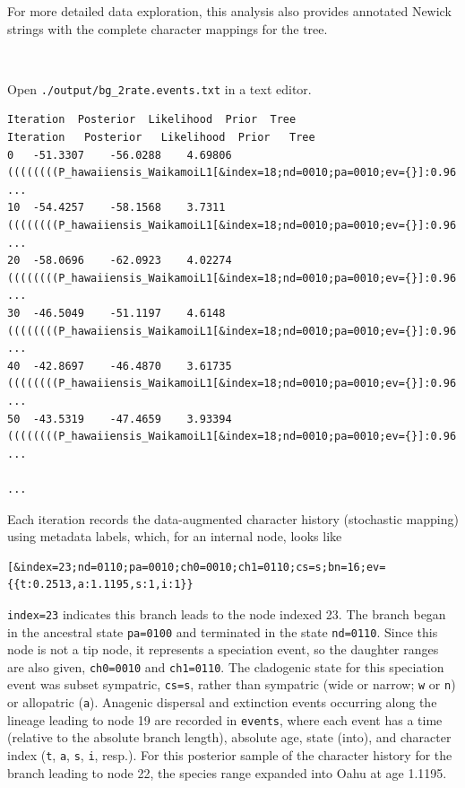 \documentclass[11pt]{article}
\newcommand{\impmark}{\strut\vadjust{\domark}}
\newcommand{\domark}{%
  \vbox to 0pt{
    \kern-\dp\strutbox
    \smash{\llap{$\rightarrow$\kern1em}}
    \vss
  }%
}
\begin{document}
For more detailed data exploration, this analysis also provides annotated Newick strings with the complete character mappings for the tree.

\noindent \\ \impmark Open {\tt ./output/bg\_2rate.events.txt} in a text editor.

\begin{framed}
\begin{lstlisting}[basicstyle=\tiny \listingsfont, columns=texcl]
Iteration  Posterior  Likelihood  Prior  Tree
Iteration	Posterior	Likelihood	Prior	Tree
0	-51.3307	-56.0288	4.69806	((((((((P_hawaiiensis_WaikamoiL1[&index=18;nd=0010;pa=0010;ev={}]:0.96 ...
10	-54.4257	-58.1568	3.7311	((((((((P_hawaiiensis_WaikamoiL1[&index=18;nd=0010;pa=0010;ev={}]:0.96 ...
20	-58.0696	-62.0923	4.02274	((((((((P_hawaiiensis_WaikamoiL1[&index=18;nd=0010;pa=0010;ev={}]:0.96 ...
30	-46.5049	-51.1197	4.6148	((((((((P_hawaiiensis_WaikamoiL1[&index=18;nd=0010;pa=0010;ev={}]:0.96 ...
40	-42.8697	-46.4870	3.61735	((((((((P_hawaiiensis_WaikamoiL1[&index=18;nd=0010;pa=0010;ev={}]:0.96 ...
50	-43.5319	-47.4659	3.93394	((((((((P_hawaiiensis_WaikamoiL1[&index=18;nd=0010;pa=0010;ev={}]:0.96 ...

...
\end{lstlisting}
\end{framed}

Each iteration records the data-augmented character history (stochastic mapping) using metadata labels, which, for an internal node, looks like

\begin{snugshade}
\begin{lstlisting}
[&index=23;nd=0110;pa=0010;ch0=0010;ch1=0110;cs=s;bn=16;ev={{t:0.2513,a:1.1195,s:1,i:1}}
\end{lstlisting}
\end{snugshade}

{\tt index=23} indicates this branch leads to the node indexed 23.
The branch began in the ancestral state {\tt pa=0100} and terminated in the state {\tt nd=0110}.
Since this node is not a tip node, it represents a speciation event, so the daughter ranges are also given, {\tt ch0=0010} and {\tt ch1=0110}.
The cladogenic state for this speciation event was subset sympatric, {\tt cs=s}, rather than sympatric (wide or narrow; {\tt w} or  {\tt n}) or allopatric ({\tt a}).
Anagenic dispersal and extinction events occurring along the lineage leading to node 19 are recorded in {\tt events}, where each event has a time (relative to the absolute branch length), absolute age, state (into), and character index ({\tt t}, {\tt a}, {\tt s}, {\tt i}, resp.).
For this posterior sample of the character history for the branch leading to node 22, the species range expanded into Oahu at age 1.1195.
\end{document}
